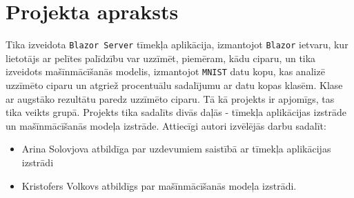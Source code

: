 \section{Projekta apraksts}

    Tika izveidota \texttt{Blazor Server} tīmekļa aplikācija, izmantojot \texttt{Blazor} ietvaru, kur lietotājs
    ar pelītes palīdzību var uzzīmēt, piemēram, kādu ciparu, un tika izveidots mašīnmācīšanās modelis,
    izmantojot \texttt{MNIST} datu kopu, kas analizē uzzīmēto ciparu un atgriež procentuālu sadalījumu
    ar datu kopas klasēm. Klase ar augstāko rezultātu paredz uzzīmēto ciparu. Tā kā projekts ir apjomīgs,
    tas tika veikts grupā. Projekts tika sadalīts divās daļās - tīmekļa aplikācijas izstrāde un
    mašīnmācīšanās modeļa izstrāde. Attiecīgi autori izvēlējās darbu sadalīt:

    \begin{itemize}
        \item Arina Solovjova atbildīga par uzdevumiem saistībā ar tīmekļa
    aplikācijas izstrādi
        \item Kristofers Volkovs atbildīgs par mašīnmācīšanās modeļa izstrādi.
    \end{itemize}

    

    

